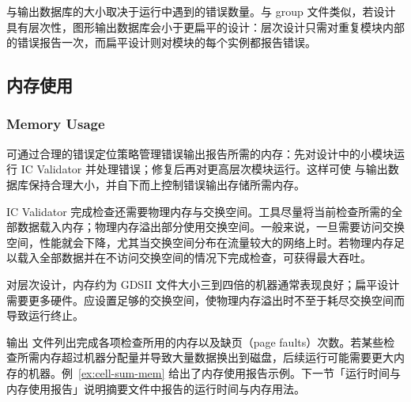  与输出数据库的大小取决于运行中遇到的错误数量。与 group 文件类似，若设计具有层次性，图形输出数据库会小于更扁平的设计：层次设计只需对重复模块内部的错误报告一次，而扁平设计则对模块的每个实例都报告错误。

\subsection{内存使用}
\subsubsection*{Memory Usage}

可通过合理的错误定位策略管理错误输出报告所需的内存：先对设计中的小模块运行 IC Validator 并处理错误；修复后再对更高层次模块运行。这样可使  与输出数据库保持合理大小，并自下而上控制错误输出存储所需内存。

IC Validator 完成检查还需要物理内存与交换空间。工具尽量将当前检查所需的全部数据载入内存；物理内存溢出部分使用交换空间。一般来说，一旦需要访问交换空间，性能就会下降，尤其当交换空间分布在流量较大的网络上时。若物理内存足以载入全部数据并在不访问交换空间的情况下完成检查，可获得最大吞吐。

对层次设计，内存约为 GDSII 文件大小三到四倍的机器通常表现良好；扁平设计需要更多硬件。应设置足够的交换空间，使物理内存溢出时不至于耗尽交换空间而导致运行终止。

输出  文件列出完成各项检查所用的内存以及缺页（page faults）次数。若某些检查所需内存超过机器分配量并导致大量数据换出到磁盘，后续运行可能需要更大内存的机器。例~\ref{ex:cell-sum-mem} 给出了内存使用报告示例。下一节「运行时间与内存使用报告」说明摘要文件中报告的运行时间与内存用法。

